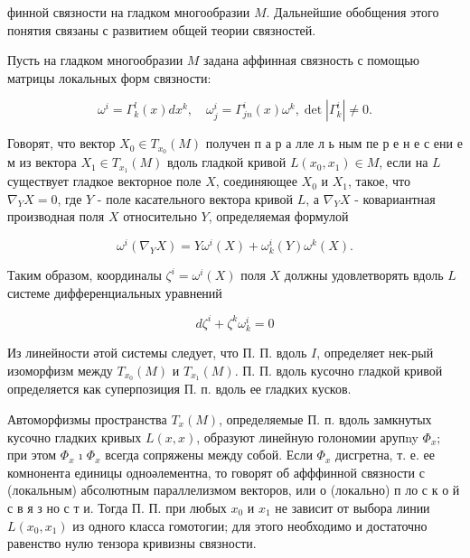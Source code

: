 \documentclass[10pt]{article}
\begin{document}
финной связности на гладком многообразии $M$. Дальнейшие обобщения этого понятия связаны с развитием общей теории связностей.



Пусть на гладком многообразии $M$ задана аффинная связность с помощью матрицы локальных форм связности:



\[

\omega^{i}=\Gamma_{k}^{l}(x) d x^{k}, \quad \omega_{j}^{i}=\Gamma_{j n}^{i}(x) \omega^{k}, \operatorname{det}\left|\Gamma_{k}^{i}\right| \neq 0 .

\]



Говорят, что вектор $X_{0} \in T_{x_{0}}(M)$ получен п а р а лле л ь ным пе р е н е с ени е м из вектора $X_{1} \in T_{x_{1}}(M)$ вдоль гладкой кривой $L\left(x_{0}, x_{1}\right) \in M$, если на $L$ существует гладкое векторное поле $X$, соединяющее $X_{0}$ и $X_{1}$, такое, что $\nabla_{Y} X=0$, где $Y$ - поле касательного вектора кривой $L$, а $\nabla_{Y} X$ - ковариантная производная поля $X$ относительно $Y$, определяемая формулой



\[

\omega^{i}\left(\nabla_{Y} X\right)=Y \omega^{i}(X)+\omega_{k}^{i}(Y) \omega^{k}(X) .

\]



Таким образом, координалы $\zeta^{i}=\omega^{i}(X)$ поля $X$ должны удовлетворять вдоль $L$ системе дифференциальных уравнений



\[

d \zeta^{i}+\zeta^{k} \omega_{k}^{i}=0

\]



Из линейности әтой системы следует, что П. П. вдоль $I$, определяет нек-рый изоморфизм между $T_{x_{0}}(M)$ и $T_{x_{1}}(M)$. П. П. вдоль кусочно гладкой кривой определяется как суперпозиция П. п. вдоль ее гладких кусков.



Автоморфизмы пространства $T_{x}(M)$, определяемые П. п. вдоль замкнутых кусочно гладких кривых $L(x, x)$, образуют линейную голономии арупny $\Phi_{x} ;$ при этом $\Phi_{x}$ ı $\Phi_{x}$ всегда сопряжены между собой. Если $\Phi_{x}$ дисгретна, т. е. ее комнонента единицы одноәлементна, то говорят об афффинной связности с (локальным) абсолютным параллелизмом векторов, или о (локально) п ло с к о й с в я з но с т и. Тогда П. П. при любых $x_{0}$ и $x_{1}$ не зависит от выбора линии $L\left(x_{0}, x_{1}\right)$ из одного класса гомотогии; для этого необходимо и достаточно равенство нулю тензора кривизны связности.
\end{document}
